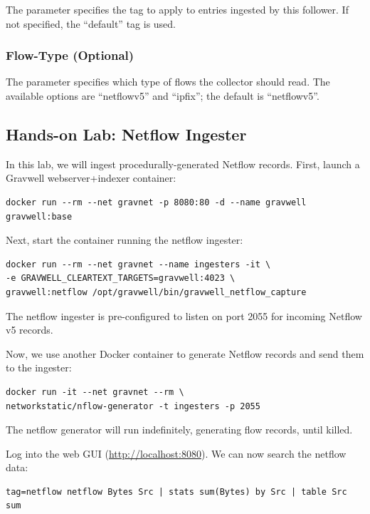 The  parameter specifies the tag to apply to entries
ingested by this follower. If not specified, the ``default'' tag is
used.

\subsubsection{Flow-Type (Optional)}

The  parameter specifies which type of flows the collector
should read. The available options are ``netflowv5'' and ``ipfix''; the
default is ``netflowv5''.

\subsection{Hands-on Lab: Netflow Ingester}

In this lab, we will ingest procedurally-generated Netflow records.
First, launch a Gravwell webserver+indexer container:

\begin{Verbatim}[breaklines=true]
docker run --rm --net gravnet -p 8080:80 -d --name gravwell gravwell:base
\end{Verbatim}

Next, start the container running the netflow ingester:

\begin{Verbatim}[breaklines=true]
docker run --rm --net gravnet --name ingesters -it \
-e GRAVWELL_CLEARTEXT_TARGETS=gravwell:4023 \
gravwell:netflow /opt/gravwell/bin/gravwell_netflow_capture
\end{Verbatim}

The netflow ingester is pre-configured to listen on port 2055 for
incoming Netflow v5 records.

Now, we use another Docker container to generate Netflow records and
send them to the ingester:

\begin{Verbatim}[breaklines=true]
docker run -it --net gravnet --rm \
networkstatic/nflow-generator -t ingesters -p 2055
\end{Verbatim}

The netflow generator will run indefinitely, generating flow records,
until killed.

Log into the web GUI (\href{http://localhost:8080}{http://localhost:8080}).
We can now search the netflow data:

\begin{Verbatim}[breaklines=true]
tag=netflow netflow Bytes Src | stats sum(Bytes) by Src | table Src sum
\end{Verbatim}

